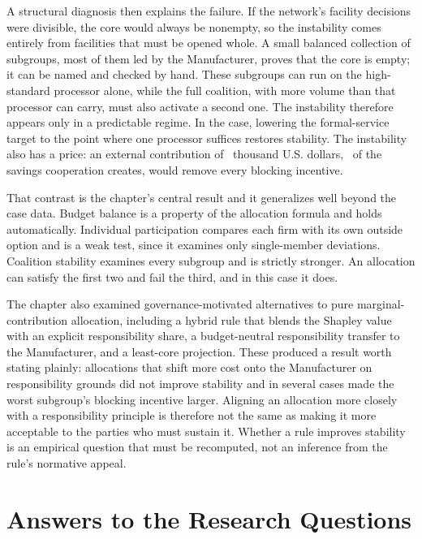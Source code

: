 A structural diagnosis then explains the failure. If the network's facility decisions were divisible, the core would always be nonempty, so the instability comes entirely from facilities that must be opened whole. A small balanced collection of subgroups, most of them led by the Manufacturer, proves that the core is empty; it can be named and checked by hand. These subgroups can run on the high-standard processor alone, while the full coalition, with more volume than that processor can carry, must also activate a second one. The instability therefore appears only in a predictable regime. In the case, lowering the formal-service target to the point where one processor suffices restores stability. The instability also has a price: an external contribution of \ChFourCostOfStability\ thousand U.S. dollars, \ChFourCoSShareSavings\ of the savings cooperation creates, would remove every blocking incentive.

That contrast is the chapter's central result and it generalizes well beyond the case data. Budget balance is a property of the allocation formula and holds automatically. Individual participation compares each firm with its own outside option and is a weak test, since it examines only single-member deviations. Coalition stability examines every subgroup and is strictly stronger. An allocation can satisfy the first two and fail the third, and in this case it does.

The chapter also examined governance-motivated alternatives to pure marginal-contribution allocation, including a hybrid rule that blends the Shapley value with an explicit responsibility share, a budget-neutral responsibility transfer to the Manufacturer, and a least-core projection. These produced a result worth stating plainly: allocations that shift more cost onto the Manufacturer on responsibility grounds did not improve stability and in several cases made the worst subgroup's blocking incentive larger. Aligning an allocation more closely with a responsibility principle is therefore not the same as making it more acceptable to the parties who must sustain it. Whether a rule improves stability is an empirical question that must be recomputed, not an inference from the rule's normative appeal.

\section{Answers to the Research Questions}
\label{sec:ch5_answers}

